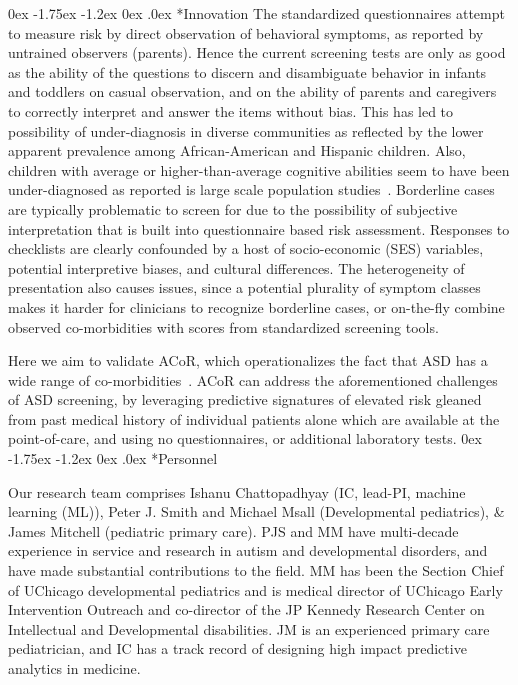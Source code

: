 \documentclass[onecolumn, compsoc,11pt]{IEEEtran}
\makeatletter
\renewcommand\subsection{\@startsection {subsection}{2}{\z@}%
                                   {0ex \@plus -1.75ex \@minus -1.2ex}%
                                   {0ex \@plus.0ex}%
                                   {\fontsize{11}{11}\selectfont\bfseries\sffamily\color{black}}}
\def\acor{ACoR\xspace}
\makeatother
\begin{document}
\subsection*{Innovation}
The standardized questionnaires attempt to measure risk by direct observation of behavioral symptoms, as reported by untrained observers (parents). Hence the current screening  tests are only as good as the ability of the questions to discern and disambiguate behavior in infants and toddlers on casual observation, and on the ability of parents and caregivers to correctly interpret and answer the items without bias.
This has led to possibility of  under-diagnosis in diverse communities as reflected by the
lower apparent prevalence among African-American and Hispanic children. Also, children with average or higher-than-average cognitive abilities seem to have been under-diagnosed as reported is large scale population studies~\cite{hyman2020identification}. Borderline cases are typically problematic to screen for due to the possibility  of subjective interpretation that is built into questionnaire based risk assessment. Responses to checklists are clearly confounded by a host of socio-economic (SES) variables, potential interpretive biases, and       cultural differences. The heterogeneity of presentation also causes issues, since a potential plurality of symptom classes makes it harder for clinicians  to recognize borderline cases, or on-the-fly combine observed co-morbidities with scores from  standardized screening tools. 

Here we aim to validate \acor, which operationalizes the fact that ASD has   a wide range  of co-morbidities~\cite{hyman2020identification}.
\acor  can  address the aforementioned   challenges of ASD screening, by leveraging predictive signatures of  elevated risk gleaned from past medical history of individual  patients alone which are available at the point-of-care, and using no questionnaires, or additional laboratory tests.
\subsection*{Personnel}

Our research team comprises Ishanu Chattopadhyay (IC, lead-PI, machine learning (ML)), Peter J. Smith and Michael Msall (Developmental pediatrics), \& James Mitchell (pediatric primary care). PJS and MM have multi-decade experience in service and research in autism and developmental disorders, and have made substantial contributions to the field. MM has been the Section Chief of UChicago developmental pediatrics and is medical director of UChicago Early Intervention Outreach and co-director of the JP Kennedy Research Center on Intellectual and Developmental disabilities. JM is an experienced primary care pediatrician, and IC has a track record of designing high impact predictive analytics in medicine.
\end{document}
